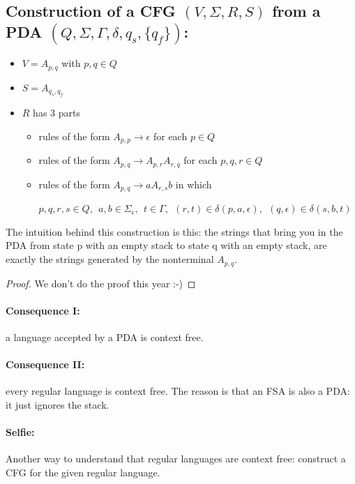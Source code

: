 \subsection{Construction of a CFG $(V,\Sigma,R,S)$ from a PDA
$(Q,\Sigma,\Gamma,\delta,q_s,\{q_f\})$:}
\begin{itemize}
\item $V = A_{p,q}$ with $p, q \in Q$
\item $S = A_{q_s,q_f}$
\item $R$ has 3 parts
\begin{itemize}
\item rules of the form $A_{p,p} \rightarrow \epsilon$ for each $p \in Q$
\item rules of the form $A_{p,q} \rightarrow A_{p,r}A_{r,q}$ for each
  $p, q, r \in Q$
\item rules of the form $A_{p,q} \rightarrow aA_{r,s}b$ in which

$p, q, r, s \in Q, ~~
a,b \in \Sigma_\epsilon, ~~
t \in \Gamma,~~
(r,t) \in \delta(p,a,\epsilon),~~
(q,\epsilon) \in \delta(s,b,t)$
\end{itemize}

\end{itemize}

The intuition behind this construction is this: the strings that bring
you in the PDA from state p with an empty stack to state q with an empty
stack, are exactly the strings generated by the nonterminal $A_{p,q}$.

\begin{proof}
We don't do the proof this year :-)
\end{proof}


\paragraph{Consequence I:} a language accepted by a PDA is context free.

\paragraph{Consequence II:} every regular language is context free. The reason is that an FSA is also a PDA: it just ignores the stack.

\paragraph{Selfie:}
Another way to understand that regular languages are context free:
construct a CFG for the given regular language.

